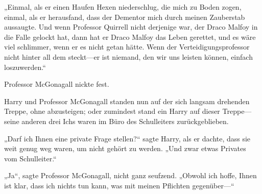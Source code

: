 „Einmal, als er einen Haufen Hexen niederschlug, die mich zu Boden zogen, einmal, als er herausfand, dass der Dementor mich durch meinen Zauberstab aussaugte. Und wenn Professor Quirrell nicht derjenige war, der Draco Malfoy in die Falle gelockt hat, dann hat er Draco Malfoy das Leben gerettet, und es wäre viel schlimmer, wenn er es nicht getan hätte. Wenn der Verteidigungsprofessor nicht hinter all dem steckt—er ist niemand, den wir uns leisten können, einfach loszuwerden.“

Professor McGonagall nickte fest.


Harry und Professor McGonagall standen nun auf der sich langsam drehenden Treppe, ohne abzusteigen; oder zumindest stand ein Harry auf dieser Treppe—seine anderen drei Ichs waren im Büro des Schulleiters zurückgeblieben.

„Darf ich Ihnen eine private Frage stellen?“ sagte Harry, als er dachte, dass sie weit genug weg waren, um nicht gehört zu werden. „Und zwar etwas Privates vom Schulleiter.“

„Ja“, sagte Professor McGonagall, nicht ganz seufzend. „Obwohl ich hoffe, Ihnen ist klar, dass ich nichts tun kann, was mit meinen Pflichten gegenüber—“

